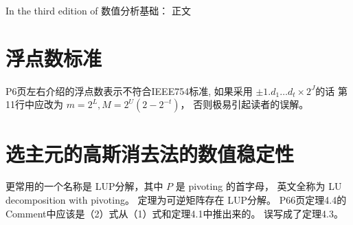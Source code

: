 \documentclass{ctexart}
\begin{document}
    In the third edition of 数值分析基础：
正文
\section{浮点数标准}
    P6页左右介绍的浮点数表示不符合IEEE754标准,
    如果采用 $\pm 1.d_1\dots d_t \times 2^J$的话
    第11行中应改为 $m=2^L, M=2^U(2-2^{-t})$，
    否则极易引起读者的误解。
\section{选主元的高斯消去法的数值稳定性}
更常用的一个名称是 LUP分解，其中 $P$ 是 pivoting 的首字母，
英文全称为 LU decomposition with pivoting。
定理为可逆矩阵存在 LUP分解。
P66页定理4.4的Comment中应该是（2）式从（1）式和定理4.1中推出来的。
误写成了定理4.3。
\end{document}

